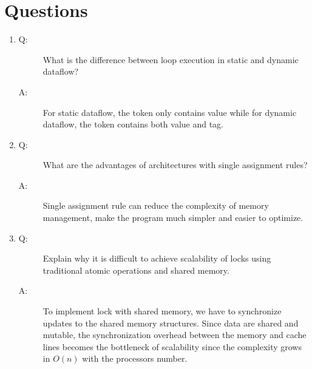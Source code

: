 \documentclass[12pt]{article}
\begin{document}
\section{Questions}
\begin{enumerate}
\item
\begin{description}
\item[Q: ] What is the difference between loop execution in static and 
dynamic dataflow?
\item[A: ] For static dataflow, the token only contains value while for 
dynamic dataflow, the token contains both value and tag.
\end{description}

\item
\begin{description}
\item[Q: ] What are the advantages of architectures with single 
assignment rules?
\item[A: ] Single assignment rule can reduce the complexity of memory
management, make the program much simpler and easier to optimize.
\end{description}

\item
\begin{description}
\item[Q: ] Explain why it is difficult to achieve scalability of 
locks using traditional atomic operations and shared memory.
\item[A: ] To implement lock with shared memory, we have to 
synchronize updates to the shared memory structures. Since data
are shared and mutable, the synchronization overhead between the 
memory and cache lines becomes the bottleneck of scalability since
the complexity grows in $O(n)$ with the processors number.

\end{description}

\end{enumerate}
\end{document}
